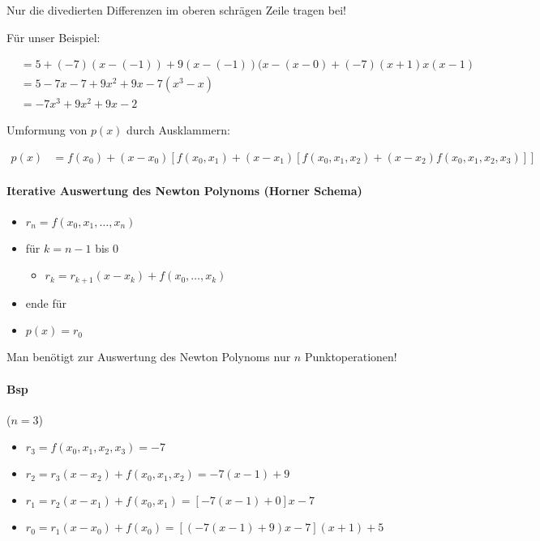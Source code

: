 \documentclass[a4paper,ngerman]{scrbook}
\begin{document}
Nur die divedierten Differenzen im oberen schrägen Zeile tragen bei!

Für unser Beispiel:

\begin{align*}
  &= 5 + (-7)(x-(-1)) + 9(x-(-1))(x-(x-0)+(-7)(x+1)x(x-1)\\
  &= 5 -7x - 7 + 9x^2 + 9x -7(x^3 - x)\\
  &= \boxed{-7x^3 + 9x^2 + 9x - 2}
\end{align*}

Umformung von $p(x)$ durch Ausklammern:

\begin{align*}
  p(x) &= f(x_0) + (x-x_0)\left[ f(x_0,x_1) + (x-x_1)\left[ f(x_0,x_1,x_2) + (x-x_2)f(x_0,x_1,x_2,x_3) \right] \right]
\end{align*}

\paragraph{Iterative Auswertung des Newton Polynoms (Horner Schema)}

\begin{itemize}
\item[] $r_n = f(x_0,x_1,\dots,x_n)$
\item[] für $k = n-1$ bis $0$
  \begin{itemize}
  \item[] $r_k = r_{k+1} (x-x_k)+f(x_0,\dots,x_k)$
  \end{itemize}
\item[] ende für
\item[] $p(x) = r_0$
\end{itemize}

Man benötigt zur Auswertung des Newton Polynoms nur $n$ Punktoperationen!

\paragraph{Bsp}
($n=3$)

\begin{itemize}
\item $r_3 = f(x_0,x_1,x_2,x_3) = -7$
\item $r_2 = r_3(x-x_2) + f(x_0,x_1,x_2) = -7(x-1)+9$
\item $r_1 = r_2(x-x_1) + f(x_0,x_1) = [-7(x-1)+0] x -7$
\item $r_0 = r_1(x-x_0) + f(x_0) = [(-7(x-1) + 9)x-7](x+1)+5$
\end{itemize}
\end{document}
